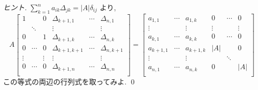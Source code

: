 \documentclass[12pt,twoside]{jarticle}
\begin{document}
\begin{proof}[ヒント]
  $\sum_{k=1}^n a_{ik}\Delta_{jk}=|A|\delta_{ij}$ より,
  \begin{equation*}
    A
    \begin{bmatrix}
      1      &        & 0      & \Delta_{k+1,1}   & \cdots & \Delta_{n,1} \\
             & \ddots &        & \vdots           &        & \vdots \\
      0      &        & 1      & \Delta_{k+1,k}   & \cdots & \Delta_{n,k} \\
      0      & \cdots & 0      & \Delta_{k+1,k+1} & \cdots & \Delta_{n,k+1} \\
      \vdots &        & \vdots & \vdots           &        & \vdots \\
      0      & \cdots & 0      & \Delta_{k+1,n}   & \cdots & \Delta_{n,n} \\
    \end{bmatrix}
    =
    \begin{bmatrix}
      a_{1,1}   & \cdots & a_{1,k}   &    0   & \cdots & 0 \\
      \vdots    &        & \vdots    & \vdots &        & \vdots \\
      a_{k,1}   & \cdots & a_{k,k}   &    0   & \cdots & 0 \\
      a_{k+1,1} & \cdots & a_{k+1,k} &   |A|  &        & 0 \\
      \vdots    &        & \vdots    &        & \ddots &   \\
      a_{n,1}   & \cdots & a_{n,k}   &    0   &        & |A| \\
    \end{bmatrix}
  \end{equation*}
  この等式の両辺の行列式を取ってみよ.
  \qed
\end{proof}
\end{document}
